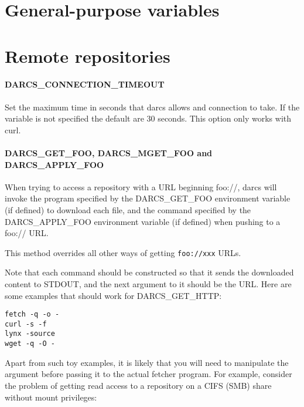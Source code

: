 \section{General-purpose variables}


\section{Remote repositories}
\paragraph{DARCS\_CONNECTION\_TIMEOUT}
\label{env:DARCS_CONNECTION_TIMEOUT}
Set the maximum time in seconds that darcs allows and connection to
take. If the variable is not specified the default are 30 seconds. This
option only works with curl.

\paragraph{DARCS\_GET\_FOO, DARCS\_MGET\_FOO and DARCS\_APPLY\_FOO}
\label{env:DARCS_X_FOO}
When trying to access a repository with a URL beginning foo://,
darcs will invoke the program specified by the DARCS\_GET\_FOO
environment variable (if defined) to download each file, and the
command specified by the DARCS\_APPLY\_FOO environment variable (if
defined) when pushing to a foo:// URL.  

This method overrides all other ways of getting \verb!foo://xxx! URLs.

Note that each command should be constructed so that it sends the downloaded
content to STDOUT, and the next argument to it should be the URL\@.  Here are some
examples that should work for DARCS\_GET\_HTTP:

\begin{verbatim}
fetch -q -o -  
curl -s -f
lynx -source 
wget -q -O -
\end{verbatim}

Apart from such toy examples, it is likely that you will need to
manipulate the argument before passing it to the actual fetcher
program.  For example, consider the problem of getting read access to
a repository on a CIFS (SMB) share without mount privileges:

